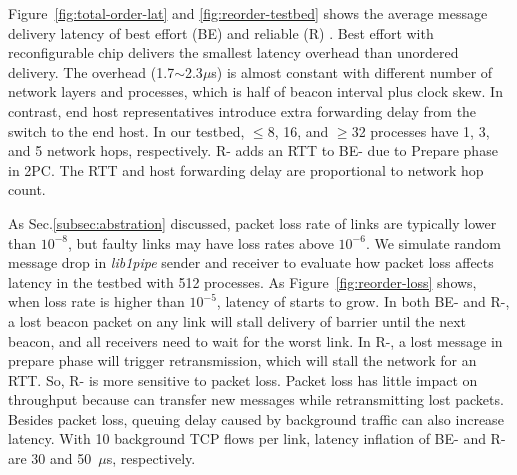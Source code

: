 Figure~\ref{fig:total-order-lat} and \ref{fig:reorder-testbed} shows the average message delivery latency of best effort (BE) and reliable (R) \sys{}.
Best effort \sys{} with reconfigurable chip delivers the smallest latency overhead than unordered delivery. The overhead (1.7$\sim$2.3$\mu$s) is almost constant with different number of network layers and processes, which is half of beacon interval plus clock skew. In contrast, end host representatives introduce extra forwarding delay from the switch to the end host. In our testbed, $\le$8, 16, and $\ge$32 processes have 1, 3, and 5 network hops, respectively.
R-\sys{} adds an RTT to BE-\sys{} due to Prepare phase in 2PC.
The RTT and host forwarding delay are proportional to network hop count.

As Sec.\ref{subsec:abstration} discussed, packet loss rate of links are typically lower than $10^{-8}$, but faulty links may have loss rates above $10^{-6}$.
We simulate random message drop in \textit{lib1pipe} sender and receiver to evaluate how packet loss affects latency in the testbed with 512 processes.
As Figure~\ref{fig:reorder-loss} shows, when loss rate is higher than $10^{-5}$, latency of \sys{} starts to grow. In both BE- and R-\sys{}, a lost beacon packet on any link will stall delivery of barrier until the next beacon, and all receivers need to wait for the worst link. In R-\sys{}, a lost message in prepare phase will trigger retransmission, which will stall the network for an RTT. So, R-\sys{} is more sensitive to packet loss.
Packet loss has little impact on throughput because \sys{} can transfer new messages while retransmitting lost packets.
Besides packet loss, queuing delay caused by background traffic can also increase \sys{} latency. With 10 background TCP flows per link, latency inflation of BE-\sys{} and R-\sys{} are 30 and 50~$\mu$s, respectively.





